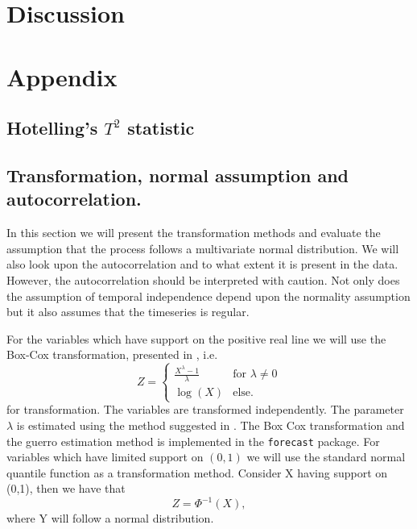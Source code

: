 \documentclass[a4paper,11pt,fleqn,twoside,notitlepage]{report}\usepackage[]{graphicx}\usepackage[]{color}
\begin{document}
\chapter{Discussion}


\chapter{Appendix}
\section{Hotelling's $T^2$ statistic}\label{HotDerivation}

\newpage
\section{Transformation, normal assumption and autocorrelation.}\label{NormalSection}




In this section we will present the transformation methods and evaluate the assumption that the process follows a multivariate normal distribution. We will also look upon the autocorrelation and to what extent it is present in the data. However, the autocorrelation should be interpreted with caution. Not only does the assumption of temporal independence depend upon the normality assumption but it also assumes that the timeseries is regular. 

For the variables which have support on the positive real line we will use the Box-Cox transformation, presented in \citet{BoxCox}, i.e.
$$
Z=
\begin{cases}
\frac{X^{\lambda}-1}{\lambda} & \text{for } \lambda \neq 0 \\
\log(X) & \text{else}.
\end{cases}
$$
for transformation. The variables are transformed independently. The parameter $\lambda$ is estimated using the method suggested in \citet{Gurrero}. The Box Cox transformation and the guerro estimation method is implemented in the \texttt{forecast} package. For variables which have limited support on $(0,1)$ we will use the standard normal quantile function as a transformation method. Consider X having support on (0,1), then we have that
$$
Z = \Phi^{-1}(X),
$$
where Y will follow a normal distribution.
\end{document}
